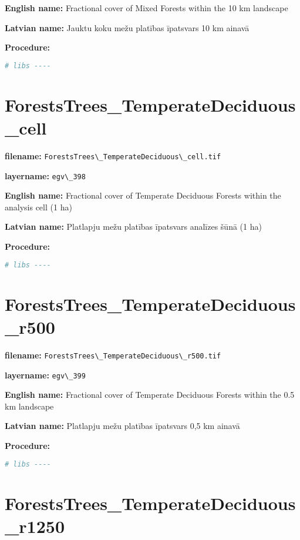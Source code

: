 \documentclass[
]{book}
\newcommand{\passthrough}[1]{#1}
\begin{document}
\textbf{English name:} Fractional cover of Mixed Forests within the 10 km landscape

\textbf{Latvian name:} Jauktu koku mežu platības īpatsvars 10 km ainavā

\textbf{Procedure:}

\begin{lstlisting}[language=R]
# libs ----
\end{lstlisting}

\section{ForestsTrees\_TemperateDeciduous\_cell}\label{ch06.398}

\textbf{filename:} \passthrough{\lstinline!ForestsTrees\_TemperateDeciduous\_cell.tif!}

\textbf{layername:} \passthrough{\lstinline!egv\_398!}

\textbf{English name:} Fractional cover of Temperate Deciduous Forests within the analysis cell (1 ha)

\textbf{Latvian name:} Platlapju mežu platības īpatsvars analīzes šūnā (1 ha)

\textbf{Procedure:}

\begin{lstlisting}[language=R]
# libs ----
\end{lstlisting}

\section{ForestsTrees\_TemperateDeciduous\_r500}\label{ch06.399}

\textbf{filename:} \passthrough{\lstinline!ForestsTrees\_TemperateDeciduous\_r500.tif!}

\textbf{layername:} \passthrough{\lstinline!egv\_399!}

\textbf{English name:} Fractional cover of Temperate Deciduous Forests within the 0.5 km landscape

\textbf{Latvian name:} Platlapju mežu platības īpatsvars 0,5 km ainavā

\textbf{Procedure:}

\begin{lstlisting}[language=R]
# libs ----
\end{lstlisting}

\section{ForestsTrees\_TemperateDeciduous\_r1250}\label{ch06.400}
\end{document}
